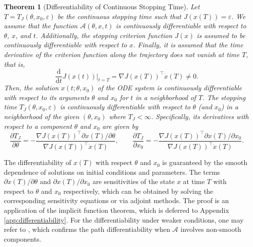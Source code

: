 \documentclass{article}
\newcommand{\Acal}{\mathcal{A}}
\newtheorem{theorem}{Theorem}
\newcommand{\dd}{\mathrm{d}}
\begin{document}
\begin{theorem}[Differentiability of Continuous Stopping Time]
\label{thm:differentiability}
Let $T = T_J(\theta, x_0, \varepsilon)$ be the continuous stopping time such that $J(x(T)) = \varepsilon$.
We assume that the function $\Acal(\theta, x, t)$ is continuously differentiable with respect to $\theta$, $x$, and $t$. Additionally, the stopping criterion function $J(x)$ is assumed to be continuously differentiable with respect to $x$. Finally, it is assumed that the time derivative of the criterion function along the trajectory does not vanish at time $T$, that is,
$$
\frac{\dd}{\dd t} J(x(t)) \Big|_{t=T} = \nabla J(x(T))^\top \dot{x}(T) \neq 0.
$$
Then, the solution $x(t; \theta, x_0)$ of the ODE system is continuously differentiable with respect to its arguments $\theta$ and $x_0$ for $t$ in a neighborhood of $T$. The stopping time $T_J(\theta, x_0, \varepsilon)$ is continuously differentiable with respect to $\theta$ (and $x_0$) in a neighborhood of the given $(\theta, x_0)$ where $T_J < \infty$.
Specifically, its derivatives with respect to a component $\theta$ and $x_{0}$ are given by
\begin{equation}
    \frac{\partial T_J}{\partial \theta} = - \frac{\nabla J(x(T))^\top {\partial x(T)}/{\partial \theta}}{\nabla J(x(T))^\top \dot{x}(T)},\qquad
    \frac{\partial T_J}{\partial x_{0}} = - \frac{\nabla J(x(T))^\top {\partial x(T)}/{\partial x_{0}}}{\nabla J(x(T))^\top \dot{x}(T)}.
\end{equation}
\end{theorem}
The differentiability of $x(T)$ with respect $\theta$ and $x_0$ is guaranteed by the smooth dependence of solutions on initial conditions and parameters. The terms ${\partial x(T)}/{\partial \theta}$ and ${\partial x(T)}/{\partial x_{0}}$ are sensitivities of the state $x$ at time $T$ with respect to $\theta$ and $x_{0}$ respectively, which can be obtained by solving the corresponding sensitivity equations or via adjoint methods. The proof is an application of the implicit function theorem, which is deferred to Appendix \ref{app:differentiability}. For the differentiability under weaker conditions, one may refer to \cite[Proposition 2]{xie2024ode}, which confirms the path differentiability \cite{bolte2021conservative} when $\Acal$ involves non-smooth components.
\end{document}
